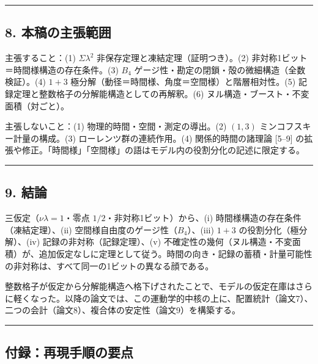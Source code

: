 \documentclass[
]{ltjsarticle}
\begin{document}
\begin{center}\rule{0.5\linewidth}{0.5pt}\end{center}

\subsection{8.
本稿の主張範囲}\label{ux672cux7a3fux306eux4e3bux5f35ux7bc4ux56f2}

主張すること：(1) \(\Sigma\lambda^2\)
非保存定理と凍結定理（証明つき）。(2)
非対称1ビット＝時間様構造の存在条件。(3) \(B_4\)
ゲージ性・勘定の閉鎖・殻の微細構造（全数検証）。(4) \(1{+}3\)
極分解（動径＝時間様、角度＝空間様）と階層相対性。(5)
記録定理と整数格子の分解能構造としての再解釈。(6)
ヌル構造・ブースト・不変面積（対ごと）。

主張しないこと：(1) 物理的時間・空間・測定の導出。(2) \((1,3)\)
ミンコフスキー計量の構成。(3) ローレンツ群の連続作用。(4)
関係的時間の諸理論 {[}5--9{]}
の拡張や修正。「時間様」「空間様」の語はモデル内の役割分化の記述に限定する。

\begin{center}\rule{0.5\linewidth}{0.5pt}\end{center}

\subsection{9. 結論}\label{ux7d50ux8ad6}

三仮定（\(\nu\lambda=1\)・零点 \(1/2\)・非対称1ビット）から、(i)
時間様構造の存在条件（凍結定理）、(ii)
空間様自由度のゲージ性（\(B_4\)）、(iii) \(1{+}3\)
の役割分化（極分解）、(iv) 記録の非対称（記録定理）、(v)
不確定性の幾何（ヌル構造・不変面積）が、追加仮定なしに定理として従う。時間の向き・記録の蓄積・計量可能性の非対称は、すべて同一の1ビットの異なる顔である。

整数格子が仮定から分解能構造へ格下げされたことで、モデルの仮定在庫はさらに軽くなった。以降の論文では、この運動学的中核の上に、配置統計（論文7）、二つの会計（論文8）、複合体の安定性（論文9）を構築する。

\begin{center}\rule{0.5\linewidth}{0.5pt}\end{center}

\subsection{付録：再現手順の要点}\label{ux4ed8ux9332ux518dux73feux624bux9806ux306eux8981ux70b9}
\end{document}
